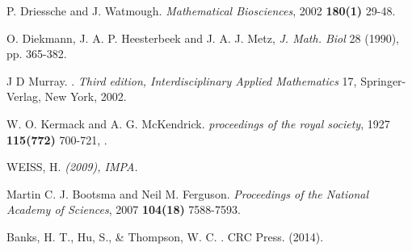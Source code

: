 \documentclass[final,a4paper,reqno]{elsarticle}
\numberwithin{equation}{section}
\begin{document}
\begin{thebibliography}{10}

  P. Driessche and J. Watmough.
{\it  Mathematical Biosciences},  2002   {\bf180(1)} 29-48.

  O. Diekmann, J. A. P. Heesterbeek and J. A. J. Metz, 
 {\it  J. Math. Biol } 28 (1990), pp. 365-382.
 
 J D Murray.
 .
{\it  Third edition, Interdisciplinary Applied Mathematics} 17,
Springer-Verlag, New York, 2002.

 W. O. Kermack and A. G. McKendrick. 
{\it proceedings of the royal society}, 1927 {\bf 115(772)} 700-721, .

 WEISS, H. 
{\it  (2009), IMPA.}

 Martin C. J. Bootsma and Neil M. Ferguson. 
 {\it  Proceedings of the National Academy of Sciences}, 2007  {\bf104(18)} 7588-7593.
 
  Banks, H. T., Hu, S., \& Thompson, W. C.
 . CRC Press.  (2014). 
 
\end{thebibliography}
\end{document}
